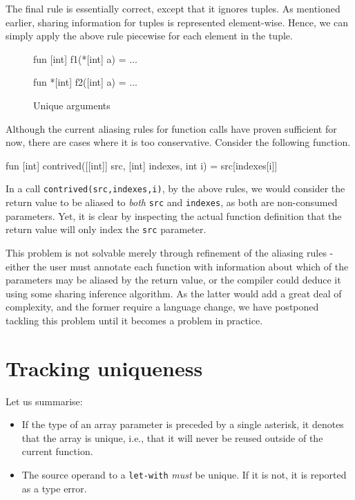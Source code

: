 The final rule is essentially correct, except that it ignores tuples.
As mentioned earlier, sharing information for tuples is represented
element-wise.  Hence, we can simply apply the above rule piecewise for
each element in the tuple.

\begin{figure}
\begin{center}
\begin{bcolorcode}
fun [int] f1(*[int] a) = ...

fun *[int] f2([int] a) = ...
\end{bcolorcode}
\end{center}
\caption{Unique arguments}
\label{fig:unique-arguments}
\end{figure}

Although the current aliasing rules for function calls have proven
sufficient for now, there are cases where it is too conservative.
Consider the following function.

\begin{colorcode}
fun [int] contrived([[int]] src, [int] indexes, int i) =
  src[indexes[i]]
\end{colorcode}

In a call \texttt{contrived(src,indexes,i)}, by the above rules, we
would consider the return value to be aliased to \textit{both}
\texttt{src} and \texttt{indexes}, as both are non-consumed
parameters.  Yet, it is clear by inspecting the actual function
definition that the return value will only index the \texttt{src}
parameter.

This problem is not solvable merely through refinement of the aliasing
rules - either the user must annotate each function with information
about which of the parameters may be aliased by the return value, or
the compiler could deduce it using some sharing inference algorithm.
As the latter would add a great deal of complexity, and the former
require a language change, we have postponed tackling this problem
until it becomes a problem in practice.

\section{Tracking uniqueness}
\label{subsec:l0-tracking-uniqueness}

Let us summarise:

\begin{itemize}
\item If the type of an array parameter is preceded by a single
  asterisk, it denotes that the array is unique, i.e., that it will
  never be reused outside of the current function.

\item The source operand to a \texttt{let-with} \textit{must} be
  unique.  If it is not, it is reported as a type error.
\end{itemize}

